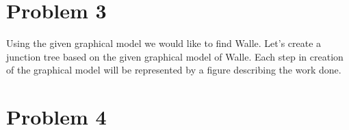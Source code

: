 \documentclass[paper=a4, fontsize=11pt]{scrartcl} %
\begin{document}
\section{Problem 3}
Using the given graphical model we would like to find Walle.  
Let's create a junction tree based on the given graphical model of Walle.
Each step in creation of the graphical model will be represented by a figure describing the work done. 


 \section{Problem 4}
\end{document}
